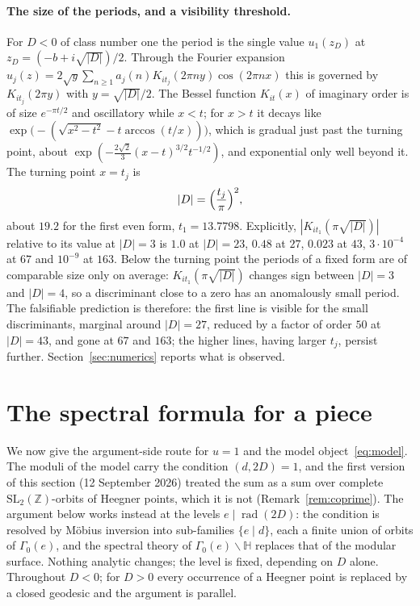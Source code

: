 \documentclass[11pt,a4paper]{article}
\theoremstyle{remark}\newtheorem{remark}[theorem]{Remark}
\newcommand{\Z}{\mathbb Z}\newcommand{\R}{\mathbb R}\newcommand{\Q}{\mathbb Q}\newcommand{\C}{\mathbb C}
\begin{document}
\paragraph{The size of the periods, and a visibility threshold.} For $D<0$ of class number one the period is the single
value $u_1(z_D)$ at $z_D=(-b+i\sqrt{|D|})/2$. Through the Fourier expansion
$u_j(z)=2\sqrt y\sum_{n\ge1}a_j(n)K_{it_j}(2\pi ny)\cos(2\pi nx)$ this is governed by $K_{it_j}(2\pi y)$ with
$y=\sqrt{|D|}/2$. The Bessel function $K_{it}(x)$ of imaginary order is of size $e^{-\pi t/2}$ and oscillatory while
$x<t$; for $x>t$ it decays like $\exp\bigl(-(\sqrt{x^2-t^2}-t\arccos(t/x))\bigr)$, which is gradual just past the
turning point, about $\exp(-\tfrac{2\sqrt2}3(x-t)^{3/2}t^{-1/2})$, and exponential only well beyond it. The turning
point $x=t_j$ is
\begin{equation}\label{eq:threshold}
|D|=\Bigl(\frac{t_j}\pi\Bigr)^2,
\end{equation}
about $19.2$ for the first even form, $t_1=13.7798$. Explicitly, $|K_{it_1}(\pi\sqrt{|D|})|$ relative to its value at
$|D|=3$ is $1.0$ at $|D|=23$, $0.48$ at $27$, $0.023$ at $43$, $3\cdot10^{-4}$ at $67$ and $10^{-9}$ at $163$. Below
the turning point the periods of a fixed form are of comparable size only on average: $K_{it_1}(\pi\sqrt{|D|})$
changes sign between $|D|=3$ and $|D|=4$, so a discriminant close to a zero has an anomalously small period. The
falsifiable prediction is therefore: the first line is visible for the small discriminants, marginal around
$|D|=27$, reduced by a factor of order $50$ at $|D|=43$, and gone at $67$ and $163$; the higher lines, having larger
$t_j$, persist further. Section~\ref{sec:numerics} reports what is observed.

\section{The spectral formula for a piece}\label{sec:formula}

We now give the argument-side route for $u=1$ and the model object~\eqref{eq:model}. The moduli of the model carry
the condition $(d,2D)=1$, and the first version of this section (12 September 2026) treated the sum as a sum over
complete $\mathrm{SL}_2(\Z)$-orbits of Heegner points, which it is not (Remark~\ref{rem:coprime}). The argument below
works instead at the levels $e\mid\operatorname{rad}(2D)$: the condition is resolved by M\"obius inversion into
sub-families $\{e\mid d\}$, each a finite union of orbits of $\Gamma_0(e)$, and the spectral theory of
$\Gamma_0(e)\backslash\mathbb H$ replaces that of the modular surface. Nothing analytic changes; the level is fixed,
depending on $D$ alone. Throughout $D<0$; for $D>0$ every occurrence of a Heegner point is replaced by a closed
geodesic and the argument is parallel.
\end{document}
